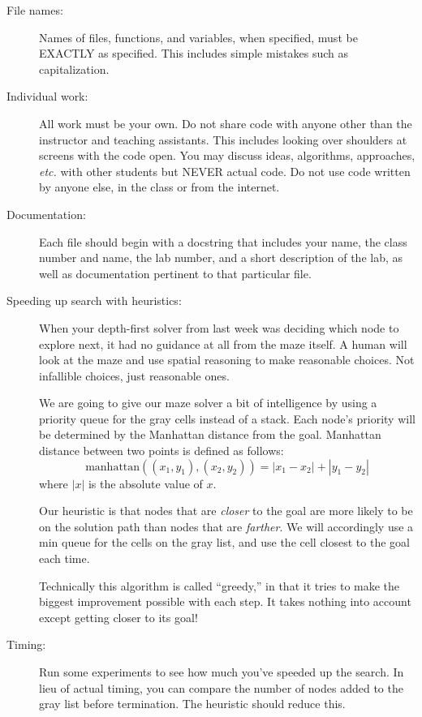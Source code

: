 \documentclass{article}
\begin{document}
\begin{description}

\item[File names:]  Names of files, functions, and variables, 
when specified,
must be EXACTLY as specified.  This includes simple mistakes such
as capitalization.

\item[Individual work:]  All work must be your own.  Do not share
code with anyone other than the instructor and teaching assistants.
This includes looking over shoulders at screens with the code open.
You may discuss ideas, algorithms, approaches, {\em etc.} with
other students but NEVER actual code.  Do not use code
written by anyone else, in the class or from the internet.

\item[Documentation:] Each file should begin with a docstring
that includes your name, the class number and name, the lab
number, and  
a short description of the lab, as well as documentation pertinent
to that particular file.

\item[Speeding up search with heuristics:]  When your depth-first
solver from last week was deciding which node to explore next,
it had no guidance at all from the maze itself.  A human will look
at the maze and use spatial reasoning to make reasonable
choices.  Not infallible choices, just reasonable ones.

We are going to give our maze solver a bit of intelligence by using
a priority queue for the gray cells instead of a stack.  Each node's
priority will be determined by the Manhattan distance from the goal.
Manhattan distance between two points is defined as follows:
\[
\mbox{manhattan}((x_1, y_1), (x_2, y_2)) =|x_1-x_2| + |y_1-y_2|
\]
where $|x|$ is the absolute value of $x$.

Our heuristic is that nodes that are {\em closer} to the goal are
more likely to be on the solution path than nodes that are {\em farther}.
We will accordingly use a min queue for the cells on the gray
list, and use the cell closest to the goal each time.

Technically this algorithm is called ``greedy,'' in that it tries
to make the biggest improvement possible with each step.
It takes nothing into account except getting closer to its goal!

\item[Timing:]  Run some experiments to see how much you've
speeded up the search.  In lieu of actual timing, you can 
compare the number of nodes added to the gray list before
termination.  The heuristic should reduce this.

\end{description}
\end{document}
